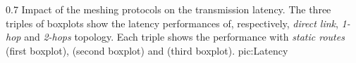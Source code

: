         {0.7 \columnwidth}
        {Impact of the meshing protocols on the transmission latency. The
         three triples of boxplots show the latency performances of,
         respectively, \emph{direct link}, \emph{1-hop} and \emph{2-hops}
         topology. Each triple shows the performance with \emph{static
         routes} (first boxplot), \emph{\batman} (second boxplot) and
         \emph{\olsr} (third boxplot).}
        {pic:Latency}


